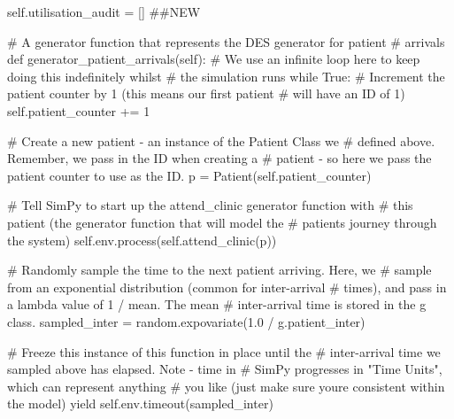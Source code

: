 \documentclass[
  letterpaper,
  DIV=11,
  numbers=noendperiod]{scrreprt}
\newenvironment{Shaded}{}{}
\newcommand{\CommentTok}[1]{\textcolor[rgb]{0.42,0.45,0.49}{#1}}
\newcommand{\ControlFlowTok}[1]{\textcolor[rgb]{0.84,0.23,0.29}{#1}}
\newcommand{\DecValTok}[1]{\textcolor[rgb]{0.00,0.36,0.77}{#1}}
\newcommand{\FloatTok}[1]{\textcolor[rgb]{0.00,0.36,0.77}{#1}}
\newcommand{\KeywordTok}[1]{\textcolor[rgb]{0.84,0.23,0.29}{#1}}
\newcommand{\NormalTok}[1]{\textcolor[rgb]{0.14,0.16,0.18}{#1}}
\newcommand{\OperatorTok}[1]{\textcolor[rgb]{0.14,0.16,0.18}{#1}}
\newcommand{\VariableTok}[1]{\textcolor[rgb]{0.89,0.38,0.04}{#1}}
\begin{document}
\begin{tcolorbox}
\begin{Shaded}
\begin{Highlighting}[]
        \VariableTok{self}\NormalTok{.utilisation\_audit }\OperatorTok{=}\NormalTok{ [] }\CommentTok{\#\#NEW}

    \CommentTok{\# A generator function that represents the DES generator for patient}
    \CommentTok{\# arrivals}
    \KeywordTok{def}\NormalTok{ generator\_patient\_arrivals(}\VariableTok{self}\NormalTok{):}
        \CommentTok{\# We use an infinite loop here to keep doing this indefinitely whilst}
        \CommentTok{\# the simulation runs}
        \ControlFlowTok{while} \VariableTok{True}\NormalTok{:}
            \CommentTok{\# Increment the patient counter by 1 (this means our first patient}
            \CommentTok{\# will have an ID of 1)}
            \VariableTok{self}\NormalTok{.patient\_counter }\OperatorTok{+=} \DecValTok{1}

            \CommentTok{\# Create a new patient {-} an instance of the Patient Class we}
            \CommentTok{\# defined above.  Remember, we pass in the ID when creating a}
            \CommentTok{\# patient {-} so here we pass the patient counter to use as the ID.}
\NormalTok{            p }\OperatorTok{=}\NormalTok{ Patient(}\VariableTok{self}\NormalTok{.patient\_counter)}

            \CommentTok{\# Tell SimPy to start up the attend\_clinic generator function with}
            \CommentTok{\# this patient (the generator function that will model the}
            \CommentTok{\# patient\textquotesingle{}s journey through the system)}
            \VariableTok{self}\NormalTok{.env.process(}\VariableTok{self}\NormalTok{.attend\_clinic(p))}

            \CommentTok{\# Randomly sample the time to the next patient arriving.  Here, we}
            \CommentTok{\# sample from an exponential distribution (common for inter{-}arrival}
            \CommentTok{\# times), and pass in a lambda value of 1 / mean.  The mean}
            \CommentTok{\# inter{-}arrival time is stored in the g class.}
\NormalTok{            sampled\_inter }\OperatorTok{=}\NormalTok{ random.expovariate(}\FloatTok{1.0} \OperatorTok{/}\NormalTok{ g.patient\_inter)}

            \CommentTok{\# Freeze this instance of this function in place until the}
            \CommentTok{\# inter{-}arrival time we sampled above has elapsed.  Note {-} time in}
            \CommentTok{\# SimPy progresses in "Time Units", which can represent anything}
            \CommentTok{\# you like (just make sure you\textquotesingle{}re consistent within the model)}
            \ControlFlowTok{yield} \VariableTok{self}\NormalTok{.env.timeout(sampled\_inter)}


\end{Highlighting}
\end{Shaded}
\end{tcolorbox}
\end{document}
